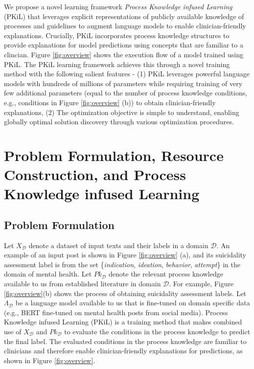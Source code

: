 \documentclass[letterpaper]{article} %
\begin{document}
We propose a novel learning framework \textit{Process Knowledge infused Learning} (PKiL) that leverages explicit representations of publicly available knowledge of processes and guidelines to augment language models to enable clinician-friendly explanations. Crucially, PKiL incorporates process knowledge structures to provide explanations for model predictions using concepts that are familiar to a clincian. Figure \ref{fig:overview} shows the execution flow of a model trained using PKiL. The PKiL learning framework achieves this through a novel training method with the following salient features - (1) PKiL leverages powerful language models with hundreds of millions of parameters while requiring training of very few additional parameters (equal to the number of process knowledge conditions, e.g., conditions in Figure \ref{fig:overview} (b)) to obtain clinician-friendly explanations, (2) The optimization objective is simple to understand, enabling globally optimal solution discovery through various optimization procedures.


\section{Problem Formulation, Resource Construction, and Process Knowledge infused Learning}
\subsection{Problem Formulation}
Let $X_{\mathcal{D}}$ denote a dataset of input texts and their labels in a domain $\mathcal{D}$. An example of an input post is shown in Figure \ref{fig:overview} (a), and its suicidality assessment label is from the set \{\textit{indication}, \textit{ideation}, \textit{behavior}, \textit{attempt}\} in the domain of mental health. Let $Pk_{\mathcal{D}}$ denote the relevant process knowledge available to us from established literature in domain $\mathcal{D}$. For example, Figure \ref{fig:overview}(b) shows the process of obtaining suicidality assessment labels. Let $\Lambda_{\mathcal{D}}$ be a language model available to us that is fine-tuned on domain specific data (e.g., BERT fine-tuned on mental health posts from social media).  Process Knowledge infused Learning (PKiL) is a training method that makes combined use of $X_{\mathcal{D}}$ and $Pk_{\mathcal{D}}$ to evaluate the conditions in the process knowledge to predict the final label. The evaluated conditions in the process knowledge are familiar to clinicians and therefore enable clinician-friendly explanations for predictions, as shown in Figure \ref{fig:overview}.
\end{document}
